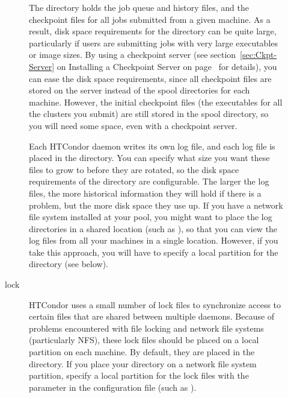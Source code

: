 \begin{description}
\begin{description}
\item[\File{spool}] The  directory holds the job queue
and history files,
and the checkpoint files for all jobs submitted from a given machine.
As a result, disk space requirements for the  directory
can be quite large,
particularly if users are submitting jobs with very large
executables or image sizes.
By using a checkpoint server
(see section~\ref{sec:Ckpt-Server} on Installing a Checkpoint Server on
page~\pageref{sec:Ckpt-Server} for details),
you can ease the disk
space requirements, since all checkpoint files are stored on the
server instead of the spool directories for each machine.  However,
the initial checkpoint files (the executables for all the clusters you
submit) are still stored in the spool directory, so you will need
%
%
some space, even with a checkpoint server.

\item[\File{log}] Each HTCondor daemon writes its own log file,
and each log file is placed
in the  directory.  You can specify what size you want these files
to grow to before they are rotated,
%
%
so the disk space requirements of
the directory are configurable.
The larger the log files, the more
historical information they will hold if there is a problem, but the
more disk space they use up.  If you have a network file system
installed at your pool, you might want to place the log directories in
a shared location (such as ),
so that you can view the log files from all your machines in a single
location.  However, if you take this approach, you will have to
specify a local partition for the  directory (see below).

\item[lock] HTCondor uses a small number of lock files to synchronize
access to certain files that are shared between multiple daemons.
Because of problems encountered with file locking and network
file systems (particularly NFS), these lock files should be placed on a
local partition on each machine.  By default, they are placed in
the  directory.  If you place your 
directory on a network file system partition,
specify a local partition for the
lock files with the  parameter in the configuration file (such as
).


\end{description}
\end{description}
